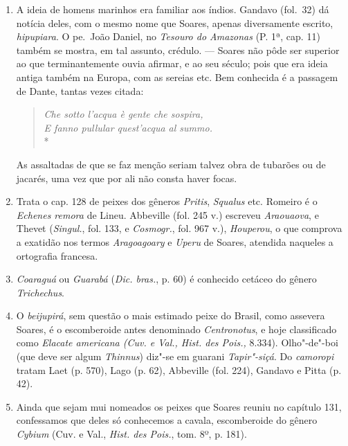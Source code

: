 \begin{enumerate}
\item A ideia de homens marinhos era familiar aos índios. Gandavo (fol.~32) dá notícia 
deles, com o mesmo nome que Soares, apenas diversamente escrito, \textit{hipupiara}. O 
pe.~João Daniel, no \textit{Tesouro do Amazonas} (P. 1ª, cap. 11) também se mostra, em tal 
assunto, crédulo. --- Soares não pôde ser superior ao que terminantemente ouvia 
afirmar, e ao seu século; pois que era ideia antiga também na Europa, com as sereias 
etc. Bem conhecida é a passagem de Dante, tantas vezes citada: 
\begin{verse}
\textit{Che sotto l'acqua è gente che sospira,\\ 
E fanno pullular quest'acqua al summo.} \\*
\end{verse}
As assaltadas de que se faz menção seriam talvez obra de tubarões ou de jacarés, uma 
vez que por ali não consta haver focas.

\item Trata o cap. 128 de peixes dos gêneros \textit{Pritis}, \textit{Squalus} etc. Romeiro é o \textit{Echenes 
remora} de Lineu. Abbeville (fol. 245 v.) escreveu \textit{Araouaova}, e Thevet (\textit{Singul.}, fol. 
133, e  \textit{Cosmogr.}, fol. 967 v.), \textit{Houperou}, o que comprova a exatidão nos termos \textit{Aragoagoary} 
e \textit{Uperu} de Soares, atendida naqueles a ortografia francesa.

\item \textit{Coaraguá} ou \textit{Guarabá} (\textit{Dic. bras.}, p. 60) é conhecido cetáceo do gênero  \textit{Trichechus}.

\item O \textit{beijupirá}, sem questão o mais estimado peixe do Brasil, como assevera Soares, 
é o escomberoide antes denominado \textit{Centronotus}, e hoje classificado como 
\textit{Elacate americana (Cuv. e Val., Hist. des Pois.,} 8.334).
Olho"-de"-boi (que deve ser algum \textit{Thinnus}) diz"-se em guarani \textit{Tapir"-siçá}. Do \textit{camoropi} 
tratam Laet (p. 570), Lago (p. 62), Abbeville (fol. 224), Gandavo e Pitta (p. 42).

\item  Ainda que sejam mui nomeados os peixes que Soares reuniu no
capítulo 131, confessamos que deles só conhecemos a cavala, escomberoide
do gênero \textit{Cybium} (Cuv. e Val., \textit{Hist. des Pois.}, tom. 8º, p. 181).


\end{enumerate}

